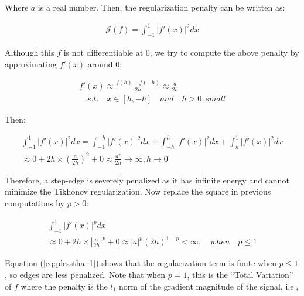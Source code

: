 Where $a$ is a real number. Then, the regularization penalty can be written as:

\begin{equation}
\begin{gathered}
\mathcal{J}(f) = \int_{-1}^{1} \left | {f}'(x) \right |^{2}dx
\end{gathered}
\end{equation}

Although this $f$ is not differentiable at 0, we try to compute the above penalty by approximating ${f}'(x)$ around 0:

\begin{equation}
\begin{gathered}
{f}'(x) \approx \frac{f(h)-f(-h)}{2h} \approx \frac{a}{2h} \\
\quad s.t. \quad x\in [h,-h] \quad and \quad h>0, small
\end{gathered}
\end{equation}

Then:

\begin{equation}
\begin{gathered}
\int_{-1}^{1} \left | {f}'(x) \right |^{2}dx = \int_{-1}^{-h} \left | {f}'(x) \right |^{2}dx + \int_{-h}^{h} \left | {f}'(x) \right |^{2}dx + \int_{h}^{1} \left | {f}'(x) \right |^{2}dx \\
\approx 0 + 2h \times (\frac{a}{2h})^{2} + 0 \approx \frac{a^2}{2h} \rightarrow \infty, h \rightarrow 0
\end{gathered}
\end{equation}

Therefore, a step-edge is severely penalized as it has infinite energy and cannot minimize the Tikhonov regularization. Now replace the square in previous computations by $p>0$:

\begin{equation}
\label{eq:plessthan1}
\begin{gathered}
\int_{-1}^{1} \left | {f}'(x) \right |^{p}dx \\
\approx 0 + 2h \times |\frac{a}{2h}|^{p} + 0 \approx |a|^{p}(2h)^{1-p} < \infty, \quad when \quad p \leq 1
\end{gathered}
\end{equation}

Equation (\ref{eq:plessthan1}) shows that the regularization term is finite when $p \leq 1$, so edges are less penalized. Note that when $p=1$, this is the ``Total Variation'' of $f$ \cite{rudin1992nonlinear} where the penalty is the $l_{1}$ norm of the gradient magnitude of the signal, i.e.,

